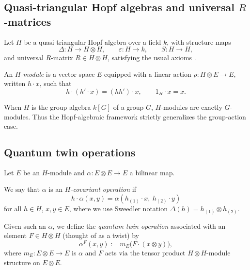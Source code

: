 \documentclass[11pt,a4paper]{article}
\numberwithin{equation}{section}
\begin{document}
	\subsection{Quasi-triangular Hopf algebras and universal $R$-matrices}
	
	Let $H$ be a quasi-triangular Hopf algebra over a field $k$, with structure maps
	\[
	\Delta:H\to H\otimes H,\qquad \varepsilon:H\to k,\qquad S:H\to H,
	\]
	and universal $R$-matrix $R\in H\otimes H$, satisfying the usual axioms
	\cite{Drinfeld1986,ChariPressley1994,Kassel1995}.
	
	\begin{definition}
		An \emph{$H$-module} is a vector space $E$ equipped with a linear action 
		$\rho:H\otimes E\to E$, written $h\cdot x$, such that
		\[
		h\cdot(h'\cdot x) = (hh')\cdot x,\qquad 1_H\cdot x = x.
		\]
	\end{definition}
	
	\begin{remark}
		When $H$ is the group algebra $k[G]$ of a group $G$, $H$-modules are exactly $G$-modules.
		Thus the Hopf-algebraic framework strictly generalizes the group-action case.
	\end{remark}
	
	\subsection{Quantum twin operations}
	
	Let $E$ be an $H$-module and $\alpha:E\otimes E\to E$ a bilinear map.
	
	\begin{definition}
		We say that $\alpha$ is an \emph{$H$-covariant operation} if
		\[
		h\cdot \alpha(x,y) = \alpha(h_{(1)}\cdot x,\ h_{(2)}\cdot y)
		\]
		for all $h\in H$, $x,y\in E$, where we use Sweedler notation $\Delta(h)=h_{(1)}\otimes h_{(2)}$.
		
		Given such an $\alpha$, we define the \emph{quantum twin operation} associated with an element
		$F\in H\otimes H$ (thought of as a twist) by
		\begin{equation}\label{eq:quantum-twin-op}
			\alpha^F(x,y) := m_E\big(F\cdot (x\otimes y)\big),
		\end{equation}
		where $m_E:E\otimes E\to E$ is $\alpha$ and $F$ acts via the tensor product $H\otimes H$-module 
		structure on $E\otimes E$.
	\end{definition}
	
\end{document}
